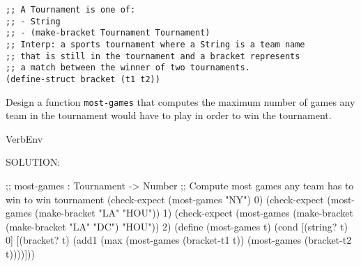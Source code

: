 \documentclass[12pt]{article}
\begin{document}
\begin{verbatim}
;; A Tournament is one of:
;; - String
;; - (make-bracket Tournament Tournament)
;; Interp: a sports tournament where a String is a team name
;; that is still in the tournament and a bracket represents
;; a match between the winner of two tournaments. 
(define-struct bracket (t1 t2))
\end{verbatim}

Design a function {\tt most-games} that computes the maximum number of
games any team in the tournament would have to play in order to win
the tournament.


\begin{SaveVerbatim}{VerbEnv}

SOLUTION:

;; most-games : Tournament -> Number
;; Compute most games any team has to win to win tournament
(check-expect (most-games "NY") 0)
(check-expect (most-games (make-bracket "LA" "HOU")) 1)
(check-expect (most-games (make-bracket (make-bracket "LA" "DC") "HOU")) 2)
(define (most-games t)
  (cond [(string? t) 0]
        [(bracket? t)
         (add1 (max (most-games (bracket-t1 t))
                    (most-games (bracket-t2 t))))]))
\end{SaveVerbatim}

\end{document}
